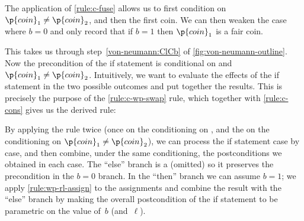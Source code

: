 \documentclass[acmsmall,nonacm,screen,appendix]{acmart}
\begin{document}
The application of \ref{rule:c-fuse}
allows us to first condition on $\p{coin}_1 \ne \p{coin}_2$,
and then the first coin.
We can then weaken the case where $b=0$ and only record that
if $b=1$ then $\p{coin}_1$ is a fair coin.

This takes us through step~\eqref{von-neumann:ClCb} of \cref{fig:von-neumann-outline}.
Now the precondition of the if statement is conditional on  and
$\p{coin}_1 \ne \p{coin}_2$.
Intuitively, we want to evaluate the effects of the if statement
in the two possible outcomes and put together the results.
This is precisely the purpose of the \ref{rule:c-wp-swap} rule,
which together with \ref{rule:c-cons} gives us the derived rule:

\begin{proofrule}
  \label{rule:c-wp-elim}
\end{proofrule}

By applying the rule twice
(once on the conditioning on ,
and the on the conditioning on $\p{coin}_1 \ne \p{coin}_2$),
we can process the if statement case by case,
and then combine, under the same conditioning, the postconditions
we obtained in each case.
The ``else'' branch is a  (omitted) so it preserves the precondition
in the $b=0$ branch.
In the ``then'' branch we can assume $b=1$; we apply \ref{rule:wp-rl-assign}
to the assignments and combine the result with the ``else'' branch by making
the overall postcondition of the if statement to be parametric
on the value of~$b$ (and~$\ell$).
\end{document}
